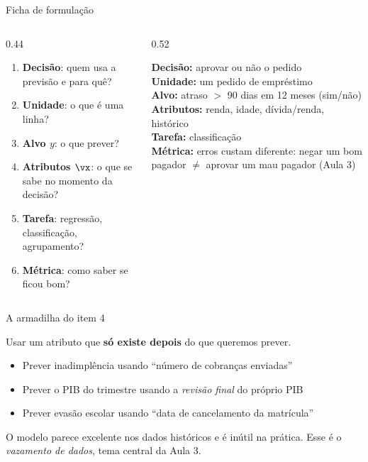 \documentclass[aspectratio=169,11pt]{beamer}
\begin{document}
\begin{frame}{Ficha de formulação}
  \begin{columns}[T]
    \begin{column}{0.44\textwidth}
      \begin{enumerate}\small
        \item \textbf{Decisão}: quem usa a previsão e para quê?
        \item \textbf{Unidade}: o que é uma linha?
        \item \textbf{Alvo $y$}: o que prever?
        \item \textbf{Atributos $\vx$}: o que se sabe \alert{no momento da decisão}?
        \item \textbf{Tarefa}: regressão, classificação, agrupamento?
        \item \textbf{Métrica}: como saber se ficou bom?
      \end{enumerate}
    \end{column}
    \begin{column}{0.52\textwidth}
      \begin{exemplo}[title={Exemplo: crédito pessoal}]
        \small
        \textbf{Decisão:} aprovar ou não o pedido\\
        \textbf{Unidade:} um pedido de empréstimo\\
        \textbf{Alvo:} atraso $>$ 90 dias em 12 meses (sim/não)\\
        \textbf{Atributos:} renda, idade, dívida/renda, histórico\\
        \textbf{Tarefa:} classificação\\
        \textbf{Métrica:} erros custam diferente: negar um bom pagador
        $\neq$ aprovar um mau pagador (Aula 3)
      \end{exemplo}
    \end{column}
  \end{columns}
\end{frame}

\begin{frame}{A armadilha do item 4}
  \begin{atencao}
    Usar um atributo que \textbf{só existe depois} do que queremos prever.
  \end{atencao}
  \medskip
  \begin{itemize}
    \item Prever inadimplência usando ``número de cobranças enviadas''
    \item Prever o PIB do trimestre usando a \emph{revisão final} do próprio PIB
    \item Prever evasão escolar usando ``data de cancelamento da matrícula''
  \end{itemize}
  \medskip
  O modelo parece excelente nos dados históricos e é \alert{inútil na prática}.
  Esse é o \emph{vazamento de dados}, tema central da Aula 3.
\end{frame}
\end{document}
